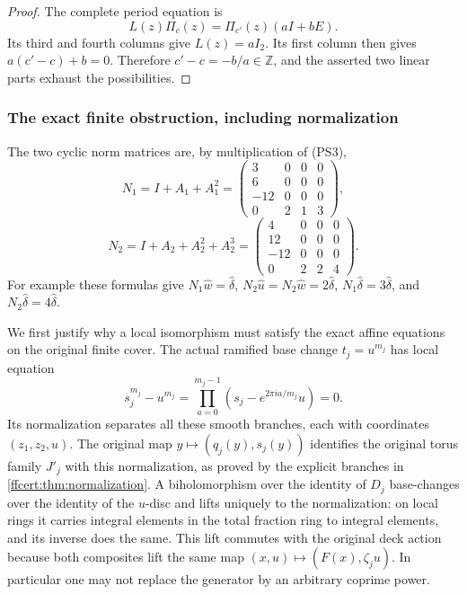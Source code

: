\begin{proof}
The complete period equation is
\[
                   L(z)\Pi_c(z)=\Pi_{c'}(z)(aI+bE).
 \tag{PS8}\label{pshift:eq:period-morphism}
\]
Its third and fourth columns give $L(z)=aI_2$. Its first column
then gives $a(c'-c)+b=0$. Therefore $c'-c=-b/a\in\mathbb Z$,
and the asserted two linear parts exhaust the possibilities.
\end{proof}

\subsubsection{The exact finite obstruction, including normalization}

The two cyclic norm matrices are, by multiplication of (PS3),
\[
 N_1=I+A_1+A_1^2=
 \begin{pmatrix}3&0&0&0\\6&0&0&0\\-12&0&0&0\\0&2&1&3\end{pmatrix},
\]
\[
 N_2=I+A_2+A_2^2+A_2^3=
 \begin{pmatrix}4&0&0&0\\12&0&0&0\\-12&0&0&0\\0&2&2&4\end{pmatrix}.
 \tag{PS9}\label{pshift:eq:norms}
\]
For example these formulas give
$N_1\widehat w=\widehat\delta$,
$N_2\widehat u=N_2\widehat w=2\widehat\delta$,
$N_1\widehat\delta=3\widehat\delta$, and
$N_2\widehat\delta=4\widehat\delta$.

We first justify why a local isomorphism must satisfy the exact affine
equations on the original finite cover. The actual ramified base change
$t_j=u^{m_j}$ has local equation
\[
 s_j^{m_j}-u^{m_j}
   =\prod_{a=0}^{m_j-1}(s_j-e^{2\pi ia/m_j}u)=0.
\]
Its normalization separates all these smooth branches, each with
coordinates $(z_1,z_2,u)$. The original map
$y\mapsto(q_j(y),s_j(y))$ identifies the original torus family $J'_j$
with this normalization, as proved by the explicit branches in
\cref{ffcert:thm:normalization}. A biholomorphism over the identity of
$D_j$ base-changes over the identity of the $u$-disc and lifts uniquely
to the normalization: on local rings it carries integral elements in
the total fraction ring to integral elements, and its inverse does
the same. This lift commutes with the original deck action because
both composites lift the same map $(x,u)\mapsto(F(x),\zeta_j u)$.
In particular one may not replace the generator by an arbitrary
coprime power.

